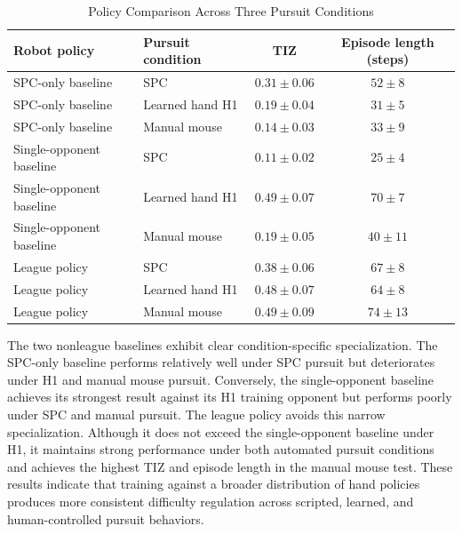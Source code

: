\documentclass[letterpaper,journal]{IEEEtran}
\begin{document}
\begin{table}[!t]
\caption{Policy Comparison Across Three Pursuit Conditions}
\label{tab:policy_comparison}
\centering
\renewcommand{\arraystretch}{1.08}
\begin{tabular}{llcc}
\toprule
Robot policy & Pursuit condition & TIZ & Episode length (steps) \\
\midrule
SPC-only baseline & SPC & $0.31\pm0.06$ & $52\pm8$ \\
SPC-only baseline & Learned hand H1 & $0.19\pm0.04$ & $31\pm5$ \\
SPC-only baseline & Manual mouse & $0.14\pm0.03$ & $33\pm9$ \\
Single-opponent baseline & SPC & $0.11\pm0.02$ & $25\pm4$ \\
Single-opponent baseline & Learned hand H1 & $0.49\pm0.07$ & $70\pm7$ \\
Single-opponent baseline & Manual mouse & $0.19\pm0.05$ & $40\pm11$ \\
League policy & SPC & $0.38\pm0.06$ & $67\pm8$ \\
League policy & Learned hand H1 & $0.48\pm0.07$ & $64\pm8$ \\
League policy & Manual mouse & $0.49\pm0.09$ & $74\pm13$ \\
\bottomrule
\end{tabular}
\end{table}
The two nonleague baselines exhibit clear condition-specific specialization. The SPC-only baseline performs relatively well under SPC pursuit but deteriorates under H1 and manual mouse pursuit. Conversely, the single-opponent baseline achieves its strongest result against its H1 training opponent but performs poorly under SPC and manual pursuit. The league policy avoids this narrow specialization. Although it does not exceed the single-opponent baseline under H1, it maintains strong performance under both automated pursuit conditions and achieves the highest TIZ and episode length in the manual mouse test. These results indicate that training against a broader distribution of hand policies produces more consistent difficulty regulation across scripted, learned, and human-controlled pursuit behaviors.
\end{document}
